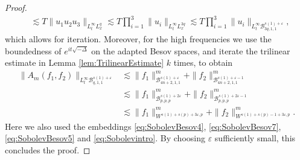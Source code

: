 \documentclass{amsart}
\theoremstyle{definition}
\newcommand {\veps}{\varepsilon}
\numberwithin{equation}{section}
\begin{document}
\begin{proof}
\begin{equation*}
\begin{split}
 &\lesssim T \| u_1 u_2 u_3 \|_{L_t^\infty L_x^q} \lesssim T \prod_{i=1}^3 \| u_i \|_{L_t^\infty L_x^{3q}} \lesssim T \prod_{i=1}^3 \| u_i \|_{L_t^\infty \mathcal{B}^{s(1)+\varepsilon}_{3q,1,1}},
\end{split}
\end{equation*}
which allows for iteration. Moreover, for the high frequencies we use the boundedness of $e^{it \sqrt{-\Delta}}$ on the adapted Besov spaces, and iterate the trilinear estimate in Lemma \ref{lem:TrilinearEstimate} $k$ times, to obtain
\begin{equation*}
\begin{split}
\| A_m (f_1,f_2) \|_{L_t^\infty \mathcal{B}^{s(1)+\veps}_{q,1,1}} &\lesssim \| f_1 \|^m_{\mathcal{B}^{s(1)+\veps}_{4n+2,1,1}} + \| f_2 \|^m_{\mathcal{B}^{s(1)+\veps-1}_{4n+2,1,1}} \\
&\lesssim \| f_1 \|^m_{\mathcal{B}^{s(1)+2\veps}_{p,p,p}} + \| f_2 \|^m_{\mathcal{B}^{s(1)+2\veps-1}_{p,p,p}} \\
&\lesssim \| f_1 \|^m_{W^{s(1)+s(p)+3\veps,p}} + \| f_2 \|^m_{W^{s(1)+s(p)-1+3\veps,p}}.
\end{split}
\end{equation*}
Here we also used the embeddings \eqref{eq:SobolevBesov4}, \eqref{eq:SobolevBesov7}, \eqref{eq:SobolevBesov5} and \eqref{eq:Sobolevintro}.
By choosing $\veps$ sufficiently small, this concludes the proof.
\end{proof}
\end{document}

